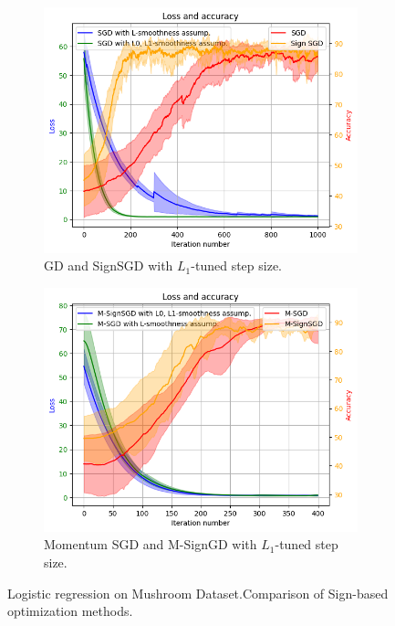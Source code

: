 \documentclass[12pt]{article}
\begin{document}
\begin{figure}[!h]
    \centering
    \begin{subfigure}[t]{0.48\textwidth}
        \centering
        \includegraphics[width=\textwidth]{basic_experiment2.png}
        \caption{GD and SignSGD with $L_1$-tuned step size.}
        \label{fig:logreg}
    \end{subfigure}
    \hfill
    \begin{subfigure}[t]{0.48\textwidth}
        \centering
        \includegraphics[width=\textwidth]{msign.png}
        \caption{ Momentum SGD  and M-SignGD with $L_1$-tuned step size.}
        \label{fig:msign}
    \end{subfigure}
    \centering
    \caption{Logistic regression on Mushroom Dataset.\newline Comparison of Sign-based optimization methods. }
    \label{fig:comparison}
\end{figure}
\end{document}
